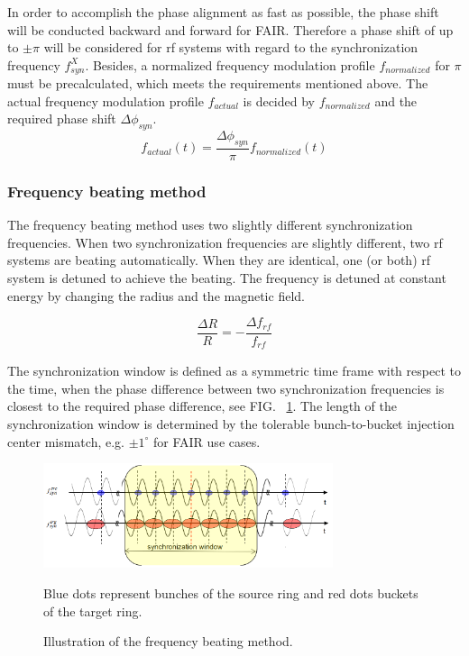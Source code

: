In order to accomplish the phase alignment as fast as possible, the phase shift will be conducted backward and forward for FAIR. Therefore a phase shift of up to $\pm \pi$ will be considered for rf systems with regard to the synchronization frequency $f_\mathit{syn}^X$. Besides, a normalized frequency modulation profile $f_{normalized}$ for $\pi$ must be precalculated, which meets the requirements mentioned above. The actual frequency modulation profile $f_{actual}$ is decided by $f_{normalized}$ and the required phase shift $\Delta \phi_\mathit{syn}$. 
\begin{equation}
f_{\mathit{actual}}(t)=\frac{\Delta \phi_\mathit{syn}}{\pi}f_{\mathit{normalized}}(t) \label{actual_profile}
\end{equation}
 

\subsubsection{Frequency beating method}
The frequency beating method uses two slightly different synchronization frequencies. When two synchronization frequencies are slightly different, two rf systems are beating automatically. When they are identical, one (or both) rf system is detuned to achieve the beating. The frequency is detuned at constant energy by changing the radius and the magnetic field. 

\begin{equation}
\frac{\Delta{R}}{R}= - \frac{\Delta f_{\mathit{rf}}}{f_{\mathit{rf}}} 
\label{eq:eq4}
\end{equation}

The synchronization window is defined as a symmetric time frame with respect to the time, when the phase difference between two synchronization frequencies is closest to the required phase difference, see FIG. ~\ref{frequency_beat}. The length of the synchronization window is determined by the tolerable bunch-to-bucket injection center mismatch, e.g. $\pm1^\circ$ for FAIR use cases.
\begin{figure}[!htb]
   \centering   
   \includegraphics*[width=85mm]{frequency_beating.png}
   \caption{Illustration of the frequency beating method.}{\small{Blue dots represent bunches of the source ring and red dots buckets of the target ring.}}
   \label{frequency_beat}
\end{figure}

